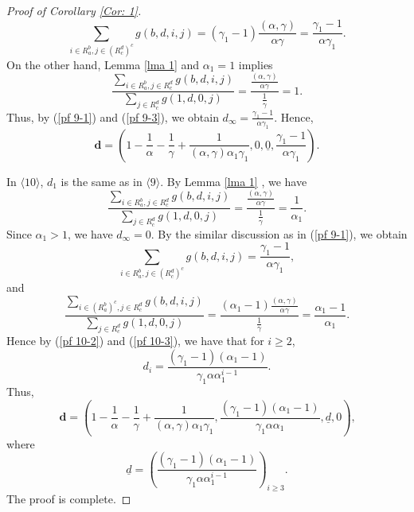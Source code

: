 \documentclass{amsart}
\theoremstyle{definition}
\numberwithin{equation}{section}%
\begin{document}
\begin{proof}[Proof of Corollary \ref{Cor: 1}]
\begin{equation}\label{pf 9-1}
    \sum_{i\in R_a^b, j\in (R_c^d)^c}g(b,d,i,j)= (\gamma_1-1)\frac{(\alpha,\gamma)}{\alpha \gamma}=\frac{\gamma _{1}-1}{\alpha
\gamma_{1}}.
\end{equation}
On the other hand, Lemma \ref{lma 1} and $\alpha_1=1$ implies
\begin{equation}\label{pf 9-3}
    \frac{\sum_{i\in R_a^b, j\in R_c^d}g(b,d,i,j)}{\sum_{ j\in R_c^d}g(1,d,0,j)}=\frac{\frac{(\alpha,\gamma)}{\alpha \gamma}}{ \frac{1}{\gamma}}=1.
\end{equation}
Thus, by (\ref{pf 9-1}) and (\ref{pf 9-3}), we obtain $d_\infty=\frac{\gamma _{1}-1}{\alpha
\gamma_{1}}$. Hence,    
\[
\mathbf{d}=\left( 1-\frac{1}{\alpha }-\frac{1}{\gamma }+\frac{1}{(\alpha
,\gamma )\alpha _{1}\gamma _{1}},0,\underline{0},\frac{\gamma _{1}-1}{\alpha
\gamma_{1}}\right).
\]

    
In $\langle 10 \rangle$, $d_1$ is the same as in $\langle 9 \rangle$. By Lemma \ref{lma 1} , we have 
\begin{equation}\label{pf 10-1}
    \frac{\sum_{i\in R_a^b, j\in R_c^d}g(b,d,i,j)}{\sum_{ j\in R_c^d}g(1,d,0,j)}=\frac{\frac{(\alpha,\gamma)}{\alpha \gamma}}{ \frac{1}{\gamma}}=\frac{1}{\alpha_1}.
\end{equation}
Since $\alpha_1>1$, we have $d_\infty=0$. By the similar discussion as in (\ref{pf 9-1}), we obtain
\begin{equation}\label{pf 10-2}
    \sum_{i\in R_a^b, j\in (R_c^d)^c}g(b,d,i,j)=\frac{\gamma _{1}-1}{\alpha
\gamma_{1}},
\end{equation}
and 
\begin{equation}\label{pf 10-3}
    \frac{\sum_{i\in (R_a^b)^c, j\in R_c^d}g(b,d,i,j)}{\sum_{ j\in R_c^d}g(1,d,0,j)}=\frac{(\alpha_1-1)\frac{(\alpha,\gamma)}{\alpha \gamma}}{ \frac{1}{\gamma}}=\frac{\alpha_1-1}{\alpha_1}.
\end{equation}
Hence by (\ref{pf 10-2}) and (\ref{pf 10-3}), we have that for $i\geq 2$,
\begin{equation*}
    d_i=\frac{(\gamma _{1}-1)(\alpha_{1}-1)}{\gamma_{1}\alpha\alpha_{1}^{i-1}}.
\end{equation*}
Thus,
\[
\mathbf{d}=\left( 1-\frac{1}{\alpha }-\frac{1}{\gamma }+\frac{1}{(\alpha
,\gamma )\alpha _{1}\gamma _{1}},\frac{(\gamma _{1}-1)(\alpha _{1}-1)}{\gamma _{1}\alpha \alpha _{1}},\underline{d},0\right) \text{,} 
\]
where 
\[
\underline{d}=\left( \frac{(\gamma _{1}-1)(\alpha_{1}-1)}{\gamma_{1}\alpha\alpha_{1}^{i-1}}\right)_{i\geq 3}
\text{.} 
\]
 The proof is complete.
\end{proof}



\end{document}
